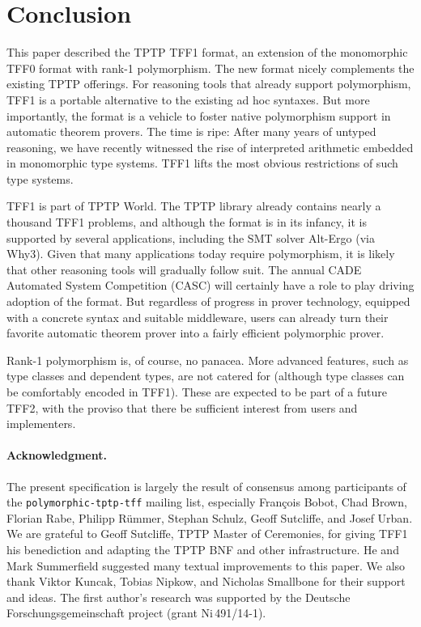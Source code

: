 \section{Conclusion}
\label{sec_concl}

This paper described the TPTP TFF1 format, an extension of the monomorphic TFF0 format
with rank-1 polymorphism. The new format nicely complements the existing TPTP
offerings. %
For reasoning tools that already
support polymorphism, TFF1 is a portable alternative to the existing ad hoc
syntaxes. But more importantly, the format is a vehicle to foster native
polymorphism support in automatic theorem provers. The time is ripe: After many
years of untyped reasoning, we have recently witnessed the rise of
interpreted arithmetic embedded in monomorphic type systems. TFF1
lifts the most obvious restrictions of such type systems.

TFF1 is part of TPTP World. The TPTP library already contains
nearly a thousand TFF1 problems, and although the format is in its
infancy, it is supported by several applications, including the SMT solver
Alt-Ergo (via Why3).
Given that many applications today require polymorphism, it
is likely that other reasoning tools will gradually follow suit.
The annual CADE Automated
System Competition (CASC) will certainly have a
role to play driving adoption of the format. But regardless of progress in
prover technology, equipped with a concrete syntax and suitable middleware,
users can already turn their favorite automatic theorem prover into a
fairly efficient polymorphic prover.

Rank-1 polymorphism is, of course, no panacea. More advanced features, such as
type classes and dependent types, are not catered for (although type
classes can be comfortably encoded in TFF1). These are expected to be
part of a future TFF2, with the proviso that there be sufficient interest from
users and implementers.

\def\ackname{Acknowledgment}
\paragraph{\textbf{\upshape\ackname.}}
%
The present specification is largely the result of consensus among
participants of the {\tt polymorphic-tptp-tff} mailing list, especially
Fran\c{c}ois Bobot, Chad Brown, Florian Rabe, Philipp R\"ummer, Stephan Schulz,
Geoff Sutcliffe, and Josef Urban.
We are grateful to Geoff Sutcliffe, TPTP Master of Ceremonies, for giving TFF1
his benediction and adapting the TPTP BNF and other infrastructure.
He and Mark Summerfield suggested many textual improvements to this paper.
We also thank Viktor Kuncak, Tobias Nipkow, and Nicholas Smallbone for their
support and ideas.
%
The first author's research was supported by the Deutsche
Forschungs\-gemein\-schaft project  (grant
Ni\,491\slash 14-1).
%
